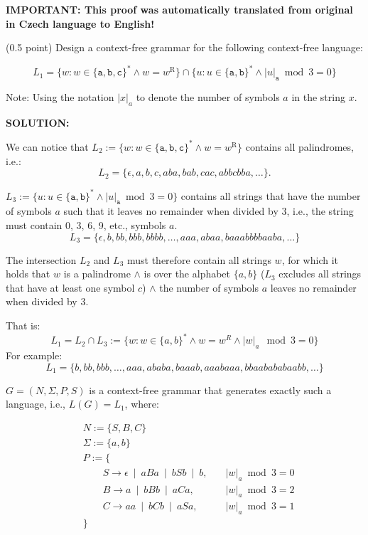\documentclass[10pt]{article}
\begin{document}
\noindent

\noindent

\textbf{IMPORTANT: This proof was automatically translated from original in Czech language to English!}

\vskip 0.5cm

(0.5 point) Design a context-free grammar for the following context-free language:

$$L_1 = \{ w : w \in \{ \mathtt{a, b, c} \}^* \wedge w = w^\mathrm{R} \} \cap \{ u : u \in \{ \mathtt{a,b} \}^* \wedge |u|_{\mathtt{a}} \bmod 3 = 0 \} $$

\noindent
Note: Using the notation $|x|_a$ to denote the number of symbols $a$ in the string $x$.

\begin{description}
   \item 
    \textbf{SOLUTION:} 
    
        We can notice that $L_2 := \{ w : w \in \{ \mathtt{a, b, c} \}^* \wedge w = w^\mathrm{R} \}$ contains all palindromes, i.e.:
        $$L_2 = \{\epsilon, a, b, c, aba, bab, cac, abbcbba, \dots \}.$$

        $L_3 := \{ u : u \in \{ \mathtt{a,b} \}^* \wedge |u|_{\mathtt{a}} \bmod 3 = 0 \} $ contains all strings that have the number of symbols $a$ such that it leaves no remainder when divided by 3, i.e., the string must contain 0, 3, 6, 9, etc., symbols $a$.
        $$L_3 =  \{\epsilon, b, bb, bbb, bbbb, \dots, aaa, abaa, baaabbbbaaba, \dots  \}$$

        The intersection $L_2$ and $L_3$ must therefore contain all strings $w$, for which it holds that $w$ is a palindrome $\land$ is over the alphabet $\{a, b\}$ ($L_3$ excludes all strings that have at least one symbol $c$) $\land$ the number of symbols $a$ leaves no remainder when divided by 3.

        That is:
        $$L_1 = L_2 \cap L_3 := \{w : w \in \{a, b\}^* \land w = w^R \land |w|_a\ \bmod 3 = 0 \}$$
        For example:
        $$L_1 =\{ b, bb, bbb, \dots, aaa, ababa, baaab, aaabaaa, bbaabababaabb, \dots\}$$
        
       $ G = (N, \Sigma, P, S ) $ is a context-free grammar that generates exactly such a language, i.e., $L(G) = L_1$, where:

       
       \begin{align*}
       & N := \{ S, B, C\}  \\
       & \Sigma := \{a, b\} \\
       & P := \{ \\
       & \qquad S \rightarrow \epsilon\ \mid\ aBa\ \mid\ bSb\ \mid\ b, \quad & |w|_a \bmod 3 = 0\\
       & \qquad B \rightarrow a\ \mid\ bBb\ \mid\ aCa, & |w|_a \bmod 3 = 2\\
       & \qquad C \rightarrow aa\ \mid\ bCb\ \mid\ aSa, & |w|_a \bmod 3 = 1\\
       & \}
       \end{align*}
       

\end{description}
\end{document}
